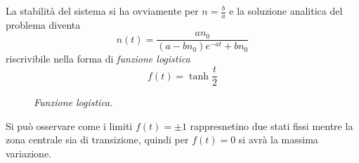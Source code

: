 \documentclass[12pt, a4paper]{book}
\theoremstyle{theorem}
\begin{document}
				La stabilità del sistema si ha ovviamente per $n=\frac{b}{a}$ e la soluzione analitica del problema diventa
				\begin{equation*}
					n(t)=\frac{an_{0}}{\left(a-bn_{0}\right)e^{-at}+bn_{0}}
				\end{equation*}
				riscrivibile nella forma di \emph{funzione logistica}
				\begin{equation}
					f(t)=\tanh\frac{t}{2}
					\label{equation:funzione_logistica}
				\end{equation}
				\begin{figure}[H]
					\centering
					\caption{\emph{Funzione logistica.}}
					\label{figure:funzione_logistica}
				\end{figure}
				Si può osservare come i limiti $f(t)=\pm 1$ rappresnetino due stati fissi mentre la zona centrale sia di transizione, quindi per $f(t)=0$ si avrà la massima variazione.
\end{document}
